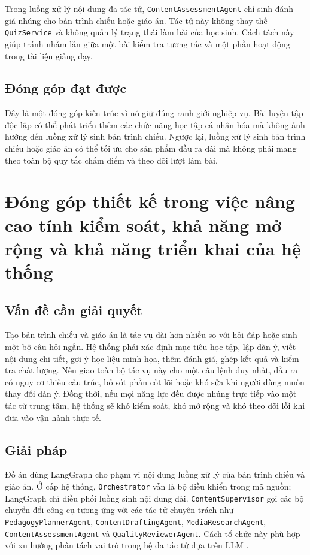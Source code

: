 \documentclass[../DoAn.tex]{subfiles}
\begin{document}
Trong luồng xử lý nội dung đa tác tử, \texttt{ContentAssessmentAgent} chỉ sinh đánh giá nhúng cho bản trình chiếu hoặc giáo án. Tác tử này không thay thế \texttt{QuizService} và không quản lý trạng thái làm bài của học sinh. Cách tách này giúp tránh nhầm lẫn giữa một bài kiểm tra tương tác và một phần hoạt động trong tài liệu giảng dạy.

\subsection{Đóng góp đạt được}

Đây là một đóng góp kiến trúc vì nó giữ đúng ranh giới nghiệp vụ. Bài luyện tập độc lập có thể phát triển thêm các chức năng học tập cá nhân hóa mà không ảnh hưởng đến luồng xử lý sinh bản trình chiếu. Ngược lại, luồng xử lý sinh bản trình chiếu hoặc giáo án có thể tối ưu cho sản phẩm đầu ra dài mà không phải mang theo toàn bộ quy tắc chấm điểm và theo dõi lượt làm bài.

\section{Đóng góp thiết kế trong việc nâng cao tính kiểm soát, khả năng mở rộng và khả năng triển khai của hệ thống}
\subsection{Vấn đề cần giải quyết}

Tạo bản trình chiếu và giáo án là tác vụ dài hơn nhiều so với hỏi đáp hoặc sinh một bộ câu hỏi ngắn. Hệ thống phải xác định mục tiêu học tập, lập dàn ý, viết nội dung chi tiết, gợi ý học liệu minh họa, thêm đánh giá, ghép kết quả và kiểm tra chất lượng. Nếu giao toàn bộ tác vụ này cho một câu lệnh duy nhất, đầu ra có nguy cơ thiếu cấu trúc, bỏ sót phần cốt lõi hoặc khó sửa khi người dùng muốn thay đổi dàn ý. Đồng thời, nếu mọi năng lực đều được nhúng trực tiếp vào một tác tử trung tâm, hệ thống sẽ khó kiểm soát, khó mở rộng và khó theo dõi lỗi khi đưa vào vận hành thực tế.

\subsection{Giải pháp}

Đồ án dùng LangGraph cho phạm vi nội dung luồng xử lý của bản trình chiếu và giáo án. Ở cấp hệ thống, \texttt{Orchestrator} vẫn là bộ điều khiển trong mã nguồn; LangGraph chỉ điều phối luồng sinh nội dung dài. \texttt{ContentSupervisor} gọi các bộ chuyển đổi công cụ tương ứng với các tác tử chuyên trách như \texttt{PedagogyPlannerAgent}, \texttt{ContentDraftingAgent}, \texttt{MediaResearchAgent}, \texttt{ContentAssessmentAgent} và \texttt{QualityReviewerAgent}. Cách tổ chức này phù hợp với xu hướng phân tách vai trò trong hệ đa tác tử dựa trên LLM \cite{guo2024multiagents,park2023generativeagents}.
\end{document}
